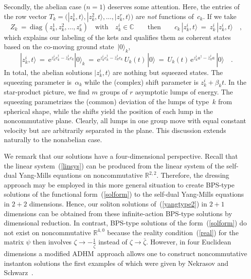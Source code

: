\documentclass[a4paper,11pt]{article}
\numberwithin{equation}{section}
\def\a{\alpha}
\def\b{\beta}
\newcommand{\C}{\mathbb C}
\newcommand{\R}{\mathbb R}
\def\e{\mbox{e}}
\newcommand{\adag}{a^{\dagger}}
\newcommand{\cdag}{c^{\dagger}}
\newcommand{\zb}{\overline{z}}
\begin{document}
Secondly, the abelian case ($n{=}1$) deserves some attention.
Here, the entries of the row vector
$T_k=\bigl(|z_k^1,t\rangle,|z_k^2,t\rangle,\ldots,|z_k^r,t\rangle\bigr)$
are {\it not\/} functions of~$c_k$. If we take
\begin{equation}
Z_k\ =\ \textrm{diag}\,(z_k^1,z_k^2,\ldots,z_k^r)
\quad\textrm{with}\quad z_k^i\in\C
\qquad\textrm{then}\qquad c_k\,|z_k^i,t\rangle\ =\ z_k^i\,|z_k^i,t\rangle\quad,
\end{equation}
which explains our labeling of the kets and qualifies them as coherent states
based on the co-moving ground state~$|0\rangle_k$,
\begin{equation}
|z_k^i,t\rangle\ =\ \e^{z_k^i\cdag_k-\zb_k^i c_k}|0\rangle_k\ =\
\e^{z_k^i\cdag_k-\zb_k^i c_k}\,U_k(t)\,|0\rangle\ =\
U_k(t)\,\e^{z_k^i\adag-\zb_k^i a}\,|0\rangle \quad.
\end{equation}
In total, the abelian solutions $|z_k^i,t\rangle$ are nothing but squeezed
states. The squeezing parameter is~$\a_k$
while the (complex) shift parameter is $z_k^i+\b_k t$.
In the star-product picture, we find $m$ groups of $r$ asymptotic lumps of
energy. The squeezing parametrizes the (common) deviation of the lumps of
type~$k$ from spherical shape, while the shifts yield the position of each
lump in the noncommutative plane. Clearly, all lumps in one group move
with equal constant velocity but are arbitrarily separated in the plane.
This discussion extends naturally to the nonabelian case.

We remark that our solutions have a four-dimensional perspective.
Recall that the linear system~(\ref{linsys}) can be produced from the linear
system of the self-dual Yang-Mills equations on noncommutative ${\R}^{2,2}$. 
Therefore, the dressing approach may be employed in this more general situation
to create BPS-type solutions of the functional form~(\ref{solform}) to the 
self-dual Yang-Mills equations in $2{+}2$ dimensions.  Hence, our soliton 
solutions of~(\ref{yangtype2}) in $2{+}1$ dimensions can be obtained from these
infinite-action BPS-type solutions by dimensional reduction.  In contrast, 
BPS-type solutions of the form~(\ref{solform}) do not exist on noncommutative
${\R}^{4,0}$ because the reality condition~(\ref{real}) for the matrix $\psi$
then involves $\zeta\to-\frac{1}{\bar\zeta}$ instead of $\zeta\to{\bar\zeta}$.
However, in four Euclidean dimensions a modified ADHM~approach allows one
to construct noncommutative instanton solutions the first examples of
which were given by Nekrasov and Schwarz~\cite{nekrasov}.
\end{document}
